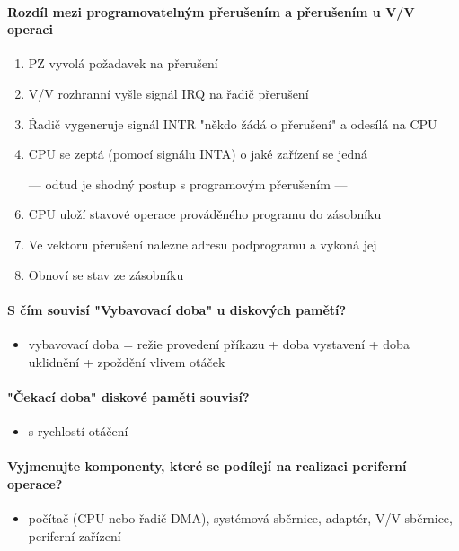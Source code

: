 \documentclass[a5paper,10pt]{article}
\begin{document}
\paragraph{Rozdíl mezi programovatelným přerušením a přerušením u V/V operaci}
\begin{enumerate}
	\item PZ vyvolá požadavek na přerušení
	\item V/V rozhranní vyšle signál IRQ na řadič přerušení
	\item Řadič vygeneruje signál INTR "někdo žádá o přerušení" a odesílá na CPU
	\item CPU se zeptá (pomocí signálu INTA) o jaké zařízení se jedná
	\item[---] odtud je shodný postup s programovým přerušením ---
	\item CPU uloží stavové operace prováděného programu do zásobníku
	\item Ve vektoru přerušení nalezne adresu podprogramu a vykoná jej
	\item Obnoví se stav ze zásobníku
\end{enumerate}

\paragraph{S čím souvisí "Vybavovací doba" u diskových pamětí?}
\begin{itemize}
	\item vybavovací doba = režie provedení příkazu + doba vystavení + doba uklidnění + zpoždění vlivem otáček
\end{itemize}

\paragraph{"Čekací doba" diskové paměti souvisí?}
\begin{itemize}
	\item s rychlostí otáčení
\end{itemize}

\paragraph{Vyjmenujte komponenty, které se podílejí na realizaci periferní operace?}
\begin{itemize}
	\item počítač (CPU nebo řadič DMA), systémová sběrnice, adaptér, V/V sběrnice, periferní zařízení
\end{itemize}
\end{document}
